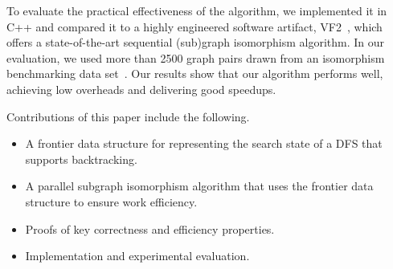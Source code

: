 To evaluate the practical effectiveness of the algorithm, we
implemented it in C++
%
and
%
compared it to a highly engineered software artifact, VF2~\cite{VF2},
which offers a state-of-the-art sequential (sub)graph isomorphism
algorithm.
%
In our evaluation, we used more than 2500 graph pairs drawn from an
isomorphism benchmarking data set~\cite{argdatabase1}.
%
Our results show that our algorithm performs well, achieving low
overheads and delivering good speedups.

Contributions of this paper include the following.
\begin{itemize}
\item A frontier data structure for representing the search state of
  a DFS that supports backtracking.

\item A parallel subgraph isomorphism algorithm that uses the frontier data
  structure to ensure work efficiency.

\item Proofs of key correctness and efficiency properties.

\item Implementation and experimental evaluation. 
\end{itemize}





